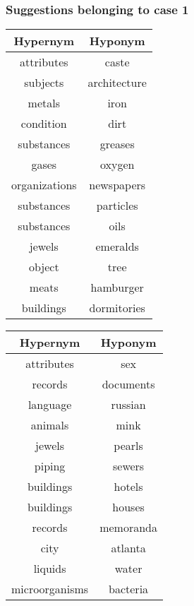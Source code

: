 \documentclass[11pt]{article}
\begin{document}
\subsubsection{Suggestions belonging to case 1}
\begin{minipage}[b]{0.5\linewidth}\centering
\begin{tabular}{c c}
Hypernym & Hyponym \\ \hline
attributes & caste \\
subjects & architecture \\
metals & iron \\
condition & dirt \\
substances & greases \\
gases & oxygen \\
organizations & newspapers \\
substances & particles \\
substances & oils \\
jewels & emeralds \\
object & tree \\
meats & hamburger \\
buildings & dormitories \\
\end{tabular}
\end{minipage}
\hspace{0.5cm}
\begin{minipage}[b]{0.5\linewidth}
\centering
\begin{tabular}{c c}
Hypernym & Hyponym \\ \hline
attributes & sex \\
records & documents \\
language & russian \\
animals & mink \\
jewels & pearls \\
piping & sewers \\
buildings & hotels \\
buildings & houses \\
records & memoranda \\
city & atlanta \\
liquids & water \\
microorganisms & bacteria \\
\end{tabular}
\end{minipage}
\end{document}
